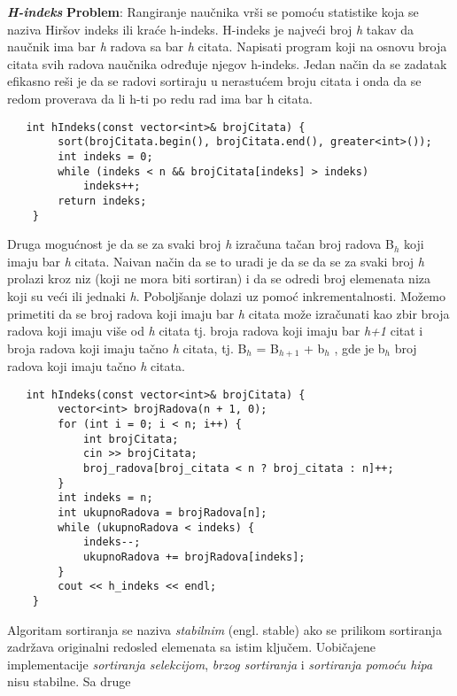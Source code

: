 \documentclass{article}
\begin{document}
\vspace{0.1cm}
\textit{\textbf{H-indeks}}
\vspace{0.2cm}\newline
\textbf{Problem}: Rangiranje naučnika vrši se pomoću statistike koja se naziva Hiršov
indeks ili kraće h-indeks. H-indeks je najveći broj \textit{h} takav da naučnik ima bar \textit{h}
radova sa bar \textit{h} citata. Napisati program koji na osnovu broja citata svih radova
naučnika određuje njegov h-indeks.
\newline
Jedan način da se zadatak efikasno reši je da se radovi sortiraju u nerastućem
broju citata i onda da se redom proverava da li h-ti po redu rad ima bar h
citata.
\newpage
\begin{lstlisting}
   int hIndeks(const vector<int>& brojCitata) {
        sort(brojCitata.begin(), brojCitata.end(), greater<int>());
        int indeks = 0;
        while (indeks < n && brojCitata[indeks] > indeks)
            indeks++;
        return indeks;
    }
\end{lstlisting}
Druga mogućnost je da se za svaki broj \textit{h} izračuna tačan broj radova B$_h$ koji imaju
bar \textit{h} citata. Naivan način da se to uradi je da se da se za svaki broj \textit{h} prolazi
kroz niz (koji ne mora biti sortiran) i da se odredi broj elemenata niza koji su
veći ili jednaki \textit{h}. Poboljšanje dolazi uz pomoć inkrementalnosti. Možemo
primetiti da se broj radova koji imaju bar \textit{h} citata može izračunati kao zbir
broja radova koji imaju više od \textit{h} citata tj. broja radova koji imaju bar \textit{h+1}
citat i broja radova koji imaju tačno \textit{h} citata, tj. B$_h$ = B$_{h+1}$ + b$_h$ , gde je b$_h$ broj
radova koji imaju tačno \textit{h} citata.
\begin{lstlisting}
   int hIndeks(const vector<int>& brojCitata) {
        vector<int> brojRadova(n + 1, 0);
        for (int i = 0; i < n; i++) {
            int brojCitata;
            cin >> brojCitata;
            broj_radova[broj_citata < n ? broj_citata : n]++;
        }
        int indeks = n;
        int ukupnoRadova = brojRadova[n];
        while (ukupnoRadova < indeks) {
            indeks--;
            ukupnoRadova += brojRadova[indeks];
        }
        cout << h_indeks << endl;
    }
\end{lstlisting}
Algoritam sortiranja se naziva \textit{stabilnim} (engl. stable) ako se prilikom sortiranja
zadržava originalni redosled elemenata sa istim ključem. Uobičajene implementacije \textit{sortiranja selekcijom}, \textit{brzog sortiranja} i \textit{sortiranja pomoću hipa} nisu stabilne. Sa druge
\end{document}
